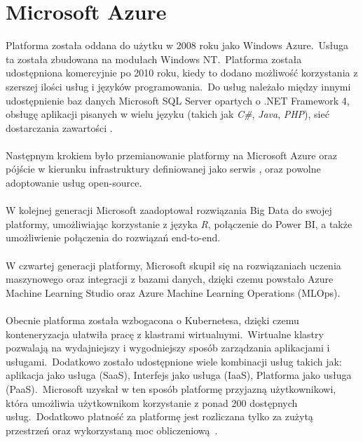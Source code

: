 \chapter{Microsoft Azure}
Platforma została oddana do użytku w 2008 roku jako Windows Azure.\ Usługa ta została zbudowana na modułach Windows NT.\ Platforma została udostępniona komercyjnie po 2010 roku, kiedy to dodano możliwość korzystania z szerszej ilości usług i języków programowania.\ Do usług należało między innymi udostępnienie baz danych Microsoft SQL Server opartych o .NET Framework 4, obsługę aplikacji pisanych w wielu języku (takich jak \textit{C\#}, \textit{Java}, \textit{PHP}), sieć dostarczania zawartości .
\\ \\
Następnym krokiem było przemianowanie platformy na Microsoft Azure oraz pójście w kierunku infrastruktury definiowanej jako serwis , oraz powolne adoptowanie usług open-source.
\\ \\
W kolejnej generacji Microsoft zaadoptował rozwiązania Big Data do swojej platformy, umożliwiając korzystanie z języka \textit{R}, połączenie do Power BI, a także umożliwienie połączenia do rozwiązań end-to-end.
\\ \\
W czwartej generacji platformy, Microsoft skupił się na rozwiązaniach uczenia maszynowego oraz integracji z bazami danych, dzięki czemu powstało Azure Machine Learning Studio oraz Azure Machine Learning Operations (MLOps).
\\ \\
Obecnie platforma została wzbogacona o Kubernetesa, dzięki czemu konteneryzacja ułatwiła pracę z klastrami wirtualnymi.\ Wirtualne klastry pozwalają na wydajniejszy i wygodniejszy sposób zarządzania aplikacjami i usługami.\ Dodatkowo zostało udostępnione wiele kombinacji usług takich jak: aplikacja jako usługa  (SaaS), Interfejs jako usługa  (IaaS), Platforma jako usługa  (PaaS).\ Microsoft uzyskał w ten sposób platformę przyjazną użytkownikowi, która umożliwia użytkownikom korzystanie z ponad 200 dostępnych usług.\ Dodatkowo płatność za platformę jest rozliczana tylko za zużytą przestrzeń oraz wykorzystaną moc obliczeniową~\cite{Roosevelt2022, MicrosoftAzurec, Datashift}.

\vfill
\pagebreak

